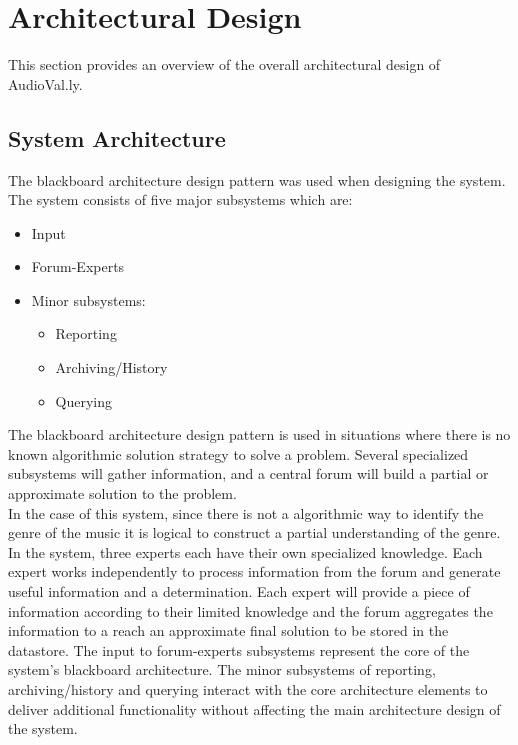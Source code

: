 \documentclass[]{article}
\begin{document}
\newpage
\section{Architectural Design}
\label{sec:architectural_design}
This section provides an overview of the overall architectural design of AudioVal.ly.

\subsection{System Architecture}
\label{sub:system_architecture}
The blackboard architecture design pattern was used when designing the system. The system consists of five major subsystems which are: 
\begin{itemize}
\item Input
\item Forum-Experts
\item Minor subsystems:
\begin{itemize}
\item Reporting
\item Archiving/History
\item Querying 
\end{itemize}
\end{itemize}
The blackboard architecture design pattern is used in situations where there is no known algorithmic solution strategy to solve a problem. Several specialized subsystems will gather information, and a central forum will build a partial or approximate solution to the problem. \\
In the case of this system, since there is not a algorithmic way to identify the genre of the music it is logical to construct a partial understanding of the genre. In the system, three experts each have their own specialized knowledge. Each expert works independently to process information from the forum and generate useful information and a determination. Each expert will provide a piece of information according to their limited knowledge and the forum aggregates the information to a reach an approximate final solution to be stored in the datastore. The input to forum-experts subsystems represent the core of the system's blackboard architecture. The minor subsystems of reporting, archiving/history and querying interact with the core architecture elements to deliver additional functionality without affecting the main architecture design of the system.
\end{document}
